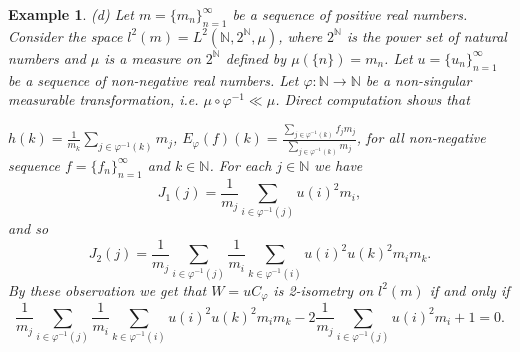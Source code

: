 \documentclass{amsart}
\newtheorem{exam}[thm]{Example}
\theoremstyle{definition}\newtheorem{defn}[thm]{Definition}
\theoremstyle{remark}
\numberwithin{equation}{section}
\begin{document}
\begin{exam}
(d)
Let $m = \{m_n\}_{n=1}^{\infty}$ be a sequence of positive real numbers. Consider the space $l^2(m) = L^2(\mathbb{N}, 2^{\mathbb{N}}, \mu)$, where $2^{\mathbb{N}}$ is the power set of natural numbers and $\mu$ is a measure on $2^{\mathbb{N}}$ defined by $\mu(\{n\}) = m_n$. Let $u = \{u_n\}_{n=1}^{\infty}$ be a sequence of non-negative real numbers. Let $\varphi: \mathbb{N} \to \mathbb{N}$ be a non-singular measurable transformation, i.e. $\mu \circ \varphi^{-1} \ll \mu$. Direct computation shows that
		
		\qquad $h(k) = \frac{1}{m_k} \sum_{j \in \varphi^{-1}(k)} m_j$, \quad $E_{\varphi}(f)(k) = \frac{\sum_{j \in \varphi^{-1}(k)} f_j m_j}{\sum_{j \in \varphi^{-1}(k)} m_j}$,
		for all non-negative sequence $f = \{f_n\}_{n=1}^{\infty}$ and $k \in \mathbb{N}$. For each $j \in \mathbb{N}$ we have 
		$$
		J_{1}(j)=\frac{1}{m_j} \sum_{i \in \varphi^{-1}(j)} u(i)^2 m_i,
		$$
and so  
$$J_{2}(j) = \frac{1}{m_j} \sum_{i \in \varphi^{-1}(j)} \frac{1}{m_i} \sum_{k \in \varphi^{-1}(i)} u(i)^2 u(k)^2m_i m_k.$$
By these observation we get that $W=uC_{\varphi}$ is 2-isometry on $l^2(m)$ if and only if 
$$\frac{1}{m_j} \sum_{i \in \varphi^{-1}(j)} \frac{1}{m_i} \sum_{k \in \varphi^{-1}(i)} u(i)^2 u(k)^2m_i m_k-2\frac{1}{m_j} \sum_{i \in \varphi^{-1}(j)} u(i)^2 m_i+1=0.$$
\end{exam}
\end{document}
